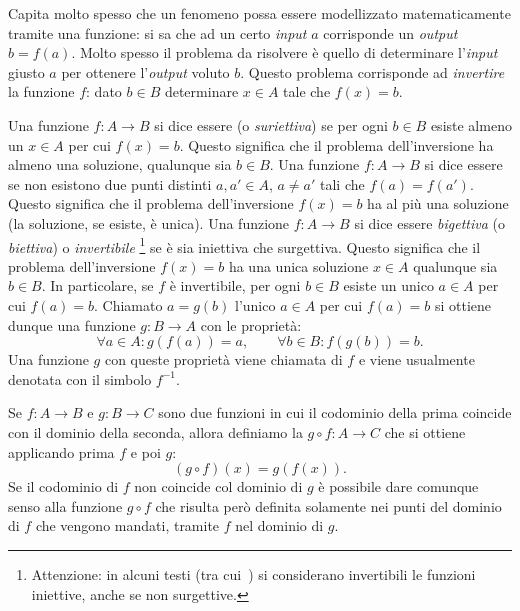 Capita molto spesso che un fenomeno possa essere modellizzato matematicamente
tramite una funzione: si sa che ad un certo \emph{input} $a$ corrisponde
un \emph{output} $b=f(a)$. Molto spesso il problema da risolvere è
quello di determinare l'\emph{input} giusto $a$ per ottenere l'\emph{output}
voluto $b$. Questo problema corrisponde ad \emph{invertire} la funzione $f$:
dato $b\in B$ determinare $x\in A$ tale che $f(x) = b$.

Una funzione $f\colon A \to B$ si dice essere  (o \emph{suriettiva})
se per ogni $b\in B$ esiste almeno un $x\in A$ per cui $f(x)=b$. Questo
significa che il problema dell'inversione ha almeno una soluzione, qualunque
sia $b\in B$.
Una funzione $f\colon A \to B$ si dice essere 
se non esistono due punti distinti $a,a' \in A$, $a\neq a'$ tali
che $f(a) = f(a')$. Questo significa che il problema dell'inversione
$f(x)=b$ ha al più una soluzione (la soluzione, se esiste, è unica).
Una funzione $f\colon A \to B$ si dice essere \emph{bigettiva}
(o \emph{biettiva})
%
%
%
%
%
%
%
o
\emph{invertibile}%
\footnote{Attenzione: in alcuni testi (tra cui~\cite{Giusti}) si considerano
invertibili le funzioni iniettive, anche se non surgettive.}
se è sia iniettiva che surgettiva. Questo significa
che il problema dell'inversione $f(x)=b$ ha una unica soluzione $x\in A$
qualunque sia $b\in B$. In particolare, se $f$ è invertibile, per ogni $b\in B$ esiste
un unico $a\in A$ per cui $f(a)=b$.
Chiamato $a=g(b)$ l'unico $a\in A$ per cui $f(a)=b$
si ottiene dunque una funzione $g\colon B\to A$ con le proprietà:
\[
  \forall a\in A\colon g(f(a)) = a, \qquad
  \forall b\in B\colon f(g(b)) = b.
\]
Una funzione $g$ con queste proprietà viene chiamata 
di $f$ e viene usualmente denotata con il simbolo $f^{-1}$.

Se $f\colon A \to B$ e $g\colon B \to C$ sono due funzioni in cui
il codominio della prima coincide con il dominio della seconda, allora
definiamo la  $g\circ f\colon A \to C$
che si ottiene applicando prima $f$ e poi $g$:
\[
  (g\circ f)(x) = g(f(x)).
\]
Se il codominio di $f$ non coincide col dominio
di $g$ è possibile dare comunque senso alla funzione $g\circ f$
che risulta però definita solamente nei punti del dominio di
$f$ che vengono mandati, tramite $f$ nel dominio di $g$.

